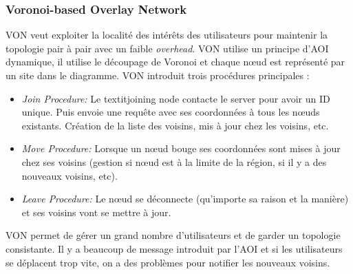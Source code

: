 		\subsubsection{Voronoi-based Overlay Network}
		 	VON veut exploiter la localité des intérêts des utilisateurs pour maintenir la topologie pair à pair avec un faible \textit{overhead}. VON utilise un principe d'AOI dynamique, il utilise le découpage de Voronoi et chaque nœud est représenté par un site dans le diagramme. VON introduit trois procédures principales :
		\begin{itemize}
	        \renewcommand{\labelitemi}{$\bullet$}
                	\item \textit{Join Procedure:} Le textit{joining node} contacte le server pour avoir un ID unique. Puis envoie une requête avec ses coordonnées à tous les nœuds existants. Création de la liste des voisins, mis à jour chez les voisins, etc.
                	\item \textit{Move Procedure:} Lorsque un nœud bouge ses coordonnées sont mises à jour chez ses voisins (gestion si nœud est à la limite de la région, si il y a des nouveaux voisins, etc).
                	\item \textit{Leave Procedure:} Le nœud se déconnecte (qu'importe sa raison et la manière) et ses voisins vont se mettre à jour.
        	\end{itemize}
        	VON permet de gérer un grand nombre d'utilisateurs et de garder un topologie consistante. Il y a beaucoup de message introduit par l'AOI et si les utilisateurs se déplacent trop vite, on a des problèmes pour notifier les nouveaux voisins.

		

	
